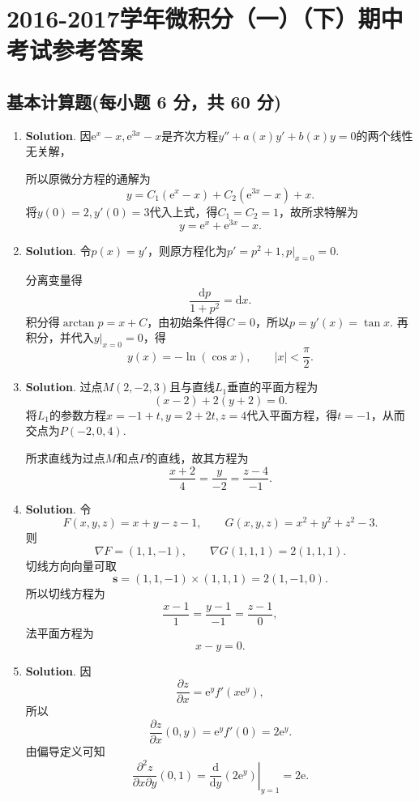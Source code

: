 \documentclass[../main.tex]{subfiles}
\begin{document}
\chapter{2016-2017学年微积分（一）（下）期中考试参考答案}
\section{基本计算题(每小题 6 分，共 60 分)}
\begin{enumerate}
    \item \textbf{Solution}. 因$\mathrm{e}^{x}-x,\mathrm{e}^{3x}-x$是齐次方程$y''
              +a(x)y'+b(x)y=0$的两个线性无关解，

          所以原微分方程的通解为
          \[
              y=C_{1}(\mathrm{e}^{x}-x)+C_{2}(\mathrm{e}^{3x}-x)+x.
          \]
          将$y(0)=2,y'(0)=3$代入上式，得$C_{1}=C_{2}=1$，故所求特解为
          \[
              y=\mathrm{e}^{x}+\mathrm{e}^{3x}-x.
          \]

    \item \textbf{Solution}. 令$p(x)=y'$，则原方程化为$p'=p^{2}+1,p|_{x=0}=0$.

          分离变量得
          \[
              \frac{\mathrm{d}p}{1+p^{2}}=\mathrm{d}x.
          \]
          积分得$\arctan p=x+C$，由初始条件得$C=0$，所以$p=y'(x)=\tan x$.
          再积分，并代入$y|_{x=0}=0$，得
          \[
              y(x)=-\ln(\cos x),\qquad |x|<\frac{\pi}{2}.
          \]

    \item \textbf{Solution}. 过点$M(2,-2,3)$且与直线$L_{1}$垂直的平面方程为
          \[
              (x-2)+2(y+2)=0.
          \]
          将$L_{1}$的参数方程$x=-1+t,y=2+2t,z=4$代入平面方程，得$t=-1$，从而交点为$P(-2,0,4)$.

          所求直线为过点$M$和点$P$的直线，故其方程为
          \[
              \frac{x+2}{4}=\frac{y}{-2}=\frac{z-4}{-1}.
          \]

    \item \textbf{Solution}. 令
          \[
              F(x,y,z)=x+y-z-1,\qquad G(x,y,z)=x^{2}+y^{2}+z^{2}-3.
          \]
          则
          \[
              \nabla F=(1,1,-1),\qquad \nabla G(1,1,1)=2(1,1,1).
          \]
          切线方向向量可取
          \[
              \boldsymbol{s}=(1,1,-1)\times(1,1,1)=2(1,-1,0).
          \]
          所以切线方程为
          \[
              \frac{x-1}{1}=\frac{y-1}{-1}=\frac{z-1}{0},
          \]
          法平面方程为
          \[
              x-y=0.
          \]

    \item \textbf{Solution}. 因
          \[
              \frac{\partial z}{\partial x}=\mathrm{e}^{y}f'(x\mathrm{e}^{y}),
          \]
          所以
          \[
              \frac{\partial z}{\partial x}(0,y)=\mathrm{e}^{y}f'(0)=2\mathrm{e}^{y}.
          \]
          由偏导定义可知
          \[
              \frac{\partial^{2}z}{\partial x\partial y}(0,1)
              =\left.\frac{\mathrm{d}}{\mathrm{d}y}\left(2\mathrm{e}^{y}\right)\right|_{y=1}=2\mathrm{e}.
          \]


\end{enumerate}
\end{document}
